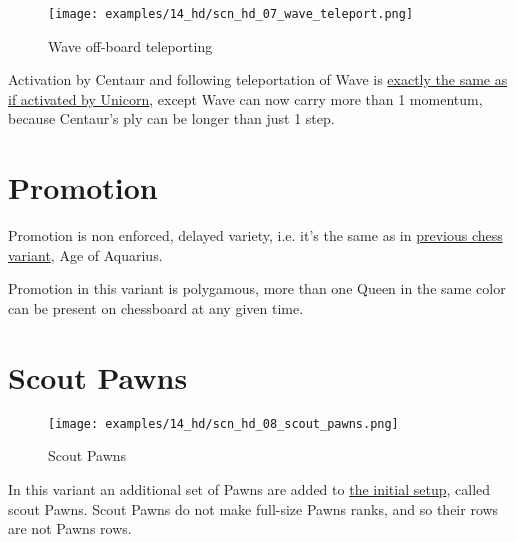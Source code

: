 \vspace*{-1.2\baselineskip}
\noindent
\begin{figure}[!h]
\texttt{[image: examples/14\_hd/scn\_hd\_07\_wave\_teleport.png]}
\caption{Wave off-board teleporting}
\label{fig:scn_hd_07_wave_teleport}
\end{figure}

Activation by Centaur and following teleportation of Wave is
\hyperref[fig:scn_n_07_teleport_wave_init]{exactly the same as if activated by Unicorn},
except Wave can now carry more than 1 momentum, because Centaur's ply can be
longer than just 1 step.

\clearpage %

\section*{Promotion}

Promotion is non enforced, delayed variety, i.e. it's the same as in
\hyperref[sec:Age of Aquarius/Promotion]{previous chess variant}, Age of Aquarius.

Promotion in this variant is polygamous, more than one Queen in the same color
can be present on chessboard at any given time.

\clearpage %

\section*{Scout Pawns}

\vspace*{-1.3\baselineskip}
\noindent
\begin{figure}[!h]
\texttt{[image: examples/14\_hd/scn\_hd\_08\_scout\_pawns.png]}
\caption{Scout Pawns}
\label{fig:scn_hd_08_scout_pawns}
\end{figure}

In this variant an additional set of Pawns are added to \hyperref[fig:14_hemera_s_dawn]{the initial setup},
called scout Pawns. Scout Pawns do not make full-size Pawns ranks, and so their rows are not Pawns rows.


